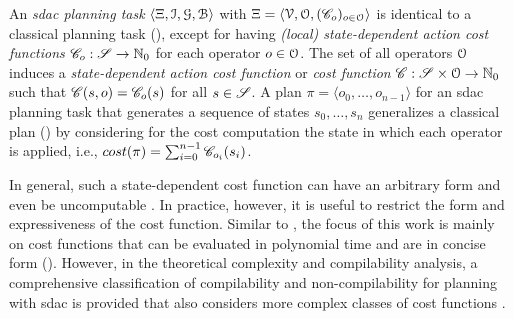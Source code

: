 \begin{definition}\label{def:planning_sdac}
    An \emph{sdac planning task} $\langle {\Xi}, \mathcal I, \mathcal G, \mathcal B \rangle$ with ${\Xi} = \langle \mathcal V, \mathcal O, (\mathscr C_o)_{o \in \mathcal O} \rangle$ is identical to a classical planning task (), except for having \emph{(local) state-dependent action cost functions} $\mathscr C_o : \mathscr S \to \mathbb{N}_0$ for each operator $o \in \mathcal O$.
    The set of all operators $\mathcal O$ induces a \emph{state-dependent action cost function} or \emph{cost function} $\mathscr C : \mathscr S \times \mathcal O \to \mathbb{N}_0$  such that $\mathscr C(s, o) = \mathscr C_o(s)$ for all $s \in \mathscr S$.
    A plan $\pi = \langle o_0, \dots, o_{n-1} \rangle$ for an sdac planning task that generates a sequence of states $s_0, \dots, s_n$ generalizes a classical plan () by considering for the cost computation the state in which each operator is applied, i.e., $cost(\pi) = \sum_{i=0}^{n-1} \mathscr C_{o_i}(s_i)$.
\end{definition}

In general, such a state-dependent cost function can have an arbitrary form and even be uncomputable \autocite{geisser-phd2018}.
In practice, however, it is useful to restrict the form and expressiveness of the cost function.
Similar to \textcite{geisser-phd2018}, the focus of this work is mainly on cost functions that can be evaluated in polynomial time and are in concise form ().
However, in the theoretical complexity and compilability analysis, a comprehensive classification of compilability and non-compilability for planning with sdac is provided that also considers more complex classes of cost functions \autocite{speck-et-al-icaps2021}.

